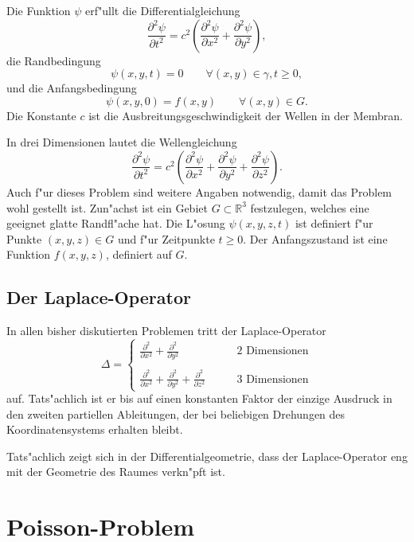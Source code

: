 Die Funktion $\psi$
erf"ullt die Differentialgleichung
\[
\frac{\partial^2\psi}{\partial t^2}
=c^2\left(\frac{\partial^2\psi}{\partial x^2}+\frac{\partial^2\psi}{\partial y^2}\right),
\]
die Randbedingung
\[
\psi(x,y,t)=0\qquad \forall (x,y)\in\gamma,t\ge 0,
\]
und die Anfangsbedingung
\[
\psi(x,y,0)=f(x,y)\qquad \forall (x,y)\in G.
\]
Die Konstante $c$ ist die Ausbreitungsgeschwindigkeit der Wellen in der Membran.

In drei Dimensionen lautet
die Wellengleichung 
\[
\frac{\partial^2\psi}{\partial t^2}
=c^2\left(\frac{\partial^2\psi}{\partial x^2}
+\frac{\partial^2\psi}{\partial y^2}
+\frac{\partial^2\psi}{\partial z^2}
\right).
\]
Auch f"ur dieses Problem sind weitere Angaben notwendig, damit das Problem
wohl gestellt ist.
Zun"achst ist ein Gebiet $G\subset \mathbb R^3$ festzulegen, welches
eine geeignet glatte Randfl"ache hat.
Die L"osung $\psi(x,y,z,t)$ ist definiert f"ur Punkte $(x,y,z)\in G$
und f"ur Zeitpunkte $t\ge 0$.
Der Anfangszustand ist eine Funktion $f(x,y,z)$,
definiert auf $G$.

\subsection{Der Laplace-Operator\label{beispiele:laplaceoperator}}
In allen bisher diskutierten Problemen tritt der Laplace-Operator
\[
\Delta
=
\begin{cases}
\displaystyle
\frac{\partial^2}{\partial x^2}
+\frac{\partial^2}{\partial y^2}&\qquad\text{2 Dimensionen}\\
\\
\displaystyle
\frac{\partial^2}{\partial x^2}
+\frac{\partial^2}{\partial y^2}
+\frac{\partial^2}{\partial z^2}&\qquad\text{3 Dimensionen}
\end{cases}
\]
auf. Tats"achlich ist er bis auf einen konstanten Faktor der einzige Ausdruck
in den zweiten partiellen Ableitungen, der bei beliebigen Drehungen des
Koordinatensystems erhalten bleibt.

Tats"achlich zeigt sich in der Differentialgeometrie, dass der Laplace-Operator
eng mit der Geometrie des Raumes verkn"pft ist.

\section{Poisson-Problem}

